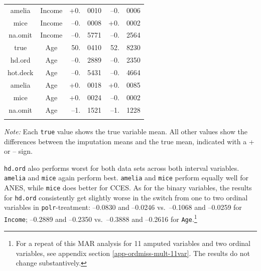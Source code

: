 \documentclass[12pt,econ]{sources/authesis}
\begin{document}
\begin{table}[!htbp]
\begin{threeparttable}
\begin{tabular}{ccr@{}lr@{}l}
 amelia & Income & +0.&0010 & --0.&0006 \\
 mice & Income & --0.&0008 & +0.&0002 \\
 na.omit & Income & --0.&5771 & --0.&2564 \\
 true & Age & 50.&0410 & 52.&8230 \\
 hd.ord & Age & --0.&2889 & --0.&2350 \\
 hot.deck & Age & --0.&5431 & --0.&4664 \\
 amelia & Age & +0.&0018 & +0.&0085 \\
 mice & Age & +0.&0024 & --0.&0002 \\ 
 na.omit & Age & --1.&1521 & --1.&1228 \\
 \hline \\[-1.8ex] 
\end{tabular} 
\begin{tablenotes}
\footnotesize{\textit{Note:} Each \texttt{true} value shows the true variable mean. All other values show the differences between the imputation means and the true mean, indicated with a + or -- sign.}
\end{tablenotes}
\end{threeparttable}
\end{table}
\texttt{hd.ord} also performs worst for both data sets across both interval variables. \texttt{amelia} and \texttt{mice} again perform best. \texttt{amelia} and \texttt{mice} perform equally well for ANES, while \texttt{mice} does better for CCES. As for the binary variables, the results for \texttt{hd.ord} consistently get slightly worse in the switch from one to two ordinal variables in \texttt{polr}-treatment: --0.0830 and --0.0246 vs.~--0.1068 and --0.0259 for \texttt{Income}; --0.2889 and --0.2350 vs.~--0.3888 and --0.2616 for \texttt{Age}.\footnote{For a repeat of this MAR analysis for 11 amputed variables and two ordinal variables, see appendix section \ref{app-ordmiss-mult-11var}. The results do not change substantively.}
\end{document}
